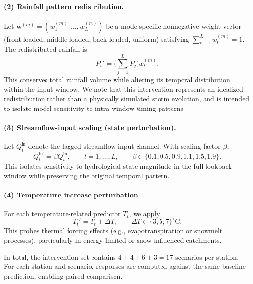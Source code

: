 \documentclass[11pt]{article}
\begin{document}
\paragraph{(2) Rainfall pattern redistribution.}
Let $\mathbf{w}^{(m)}=(w_1^{(m)},\dots,w_L^{(m)})$ be a mode-specific nonnegative weight vector (front-loaded, middle-loaded, back-loaded, uniform) satisfying $\sum_{t=1}^{L}w_t^{(m)}=1$. The redistributed rainfall is
\begin{equation}
    P_t' = \Big(\sum_{j=1}^{L}P_j\Big) w_t^{(m)}.
\end{equation}
This conserves total rainfall volume while altering its temporal distribution within the input window\cite{Wrr_p_q}. We note that this intervention represents an idealized redistribution rather than a physically simulated storm evolution, and is intended to isolate model sensitivity to intra-window timing patterns.

\paragraph{(3) Streamflow-input scaling (state perturbation).}
Let $Q_t^{\mathrm{in}}$ denote the lagged streamflow input channel. With scaling factor $\beta$,
\begin{equation}
    Q_t^{\mathrm{in}\prime} = \beta Q_t^{\mathrm{in}},
    \qquad t=1,\dots,L,
    \qquad
    \beta\in\{0.1,0.5,0.9,1.1,1.5,1.9\}.
\end{equation}
This isolates sensitivity to hydrological state magnitude in the full lookback window while preserving the original temporal pattern\cite{apak2026multi}.

\paragraph{(4) Temperature increase perturbation.}
For each temperature-related predictor $T_t$, we apply
\begin{equation}
    T_t' = T_t + \Delta T,
    \qquad
    \Delta T\in\{3,5,7\}^{\circ}\mathrm{C}.
\end{equation}
This probes thermal forcing effects (e.g., evapotranspiration or snowmelt processes), particularly in energy-limited or snow-influenced catchments\cite{milly2020colorado}.

In total, the intervention set contains $4+4+6+3=17$ scenarios per station. For each station and scenario, responses are computed against the same baseline prediction, enabling paired comparison\cite{LouiseSlater2024_XAI_Hydrology}.
\end{document}
